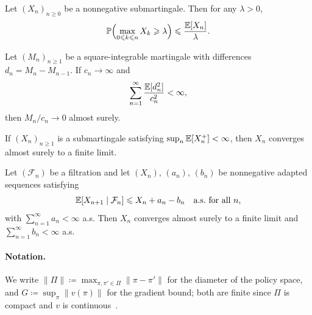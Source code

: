 \documentclass[a4paper,oneside,11pt]{report}
\newcommand{\Prob}{\mathbb{P}}
\newcommand{\calF}{\mathcal{F}}
\newcommand{\norm}[1]{\| #1 \|}
\numberwithin{theorem}{chapter}
\numberwithin{equation}{chapter}
\begin{document}
\begin{theorem}
  \label{thm:doob-max}
  Let $(X_n)_{n \ge 0}$ be a nonnegative submartingale. Then for any
  $\lambda > 0$,
  \begin{equation}
    \Prob\Bigl(\max_{0 \le k \le n} X_k \ge \lambda\Bigr)
    \le \frac{\E[X_n]}{\lambda}.
  \end{equation}
\end{theorem}

\begin{theorem}
  \label{thm:SLLN-mart}
  Let $(M_n)_{n \ge 1}$ be a square-integrable martingale with
  differences $d_n = M_n - M_{n-1}$. If $c_n \to \infty$ and
  \begin{equation}
    \sum_{n=1}^\infty \frac{\mathbb{E}[d_n^2]}{c_n^2} < \infty,
  \end{equation}
  then $M_n / c_n \to 0$ almost surely.
\end{theorem}

\begin{theorem}
  \label{thm:doob-conv}
  If $(X_n)_{n \ge 1}$ is a submartingale satisfying
  $\sup_n \mathbb{E}[X_n^+] < \infty$, then $X_n$ converges almost surely to a
  finite limit.
\end{theorem}

\begin{theorem}
  \label{thm:robbins-siegmund}
  Let $(\calF_n)$ be a filtration and let $(X_n)$, $(a_n)$, $(b_n)$ be
  nonnegative adapted sequences satisfying
  \begin{equation}
    \E[X_{n+1} \mid \calF_n] \le X_n + a_n - b_n
    \quad \text{a.s.\ for all } n,
  \end{equation}
  with $\sum_{n=1}^\infty a_n < \infty$ a.s. Then $X_n$ converges
  almost surely to a finite limit and
  $\sum_{n=1}^\infty b_n < \infty$ a.s.
\end{theorem}

\paragraph{Notation.}
We write $\norm{\Pi} \coloneqq \max_{\pi, \pi' \in \Pi} \norm{\pi - \pi'}$
for the diameter of the policy space, and
$G \coloneqq \sup_\pi \norm{v(\pi)}$ for the gradient bound; both are
finite since $\Pi$ is compact and $v$ is
continuous~\cite[Lemmas~D.5, D.7]{giannou2022}.
\end{document}
